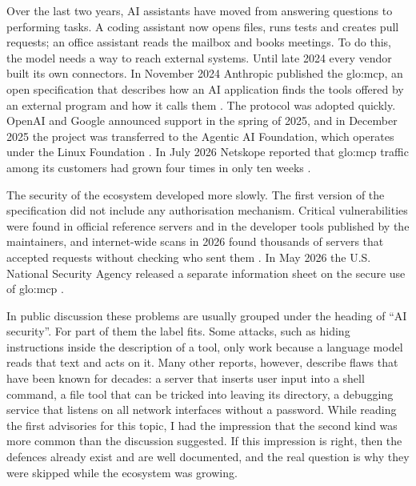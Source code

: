
\par Over the last two years, AI assistants have moved from answering questions to performing tasks. A coding assistant now opens files, runs tests and creates pull requests; an office assistant reads the mailbox and books meetings. To do this, the model needs a way to reach external systems. Until late 2024 every vendor built its own connectors. In November 2024 Anthropic published the \acrfull{glo:mcp}, an open specification that describes how an AI application finds the tools offered by an external program and how it calls them \cite{anthropic2024mcp}. The protocol was adopted quickly. OpenAI and Google announced support in the spring of 2025, and in December 2025 the project was transferred to the Agentic AI Foundation, which operates under the Linux Foundation \cite{aaif2025}. In July 2026 Netskope reported that \acrshort{glo:mcp} traffic among its customers had grown four times in only ten weeks \cite{netskope2026}.

\par The security of the ecosystem developed more slowly. The first version of the specification did not include any authorisation mechanism. Critical vulnerabilities were found in official reference servers and in the developer tools published by the maintainers, and internet-wide scans in 2026 found thousands of servers that accepted requests without checking who sent them \cite{zhou2026, padilla2026}. In May 2026 the U.S. National Security Agency released a separate information sheet on the secure use of \acrshort{glo:mcp} \cite{nsa2026}.

\par In public discussion these problems are usually grouped under the heading of ``AI security''. For part of them the label fits. Some attacks, such as hiding instructions inside the description of a tool, only work because a language model reads that text and acts on it. Many other reports, however, describe flaws that have been known for decades: a server that inserts user input into a shell command, a file tool that can be tricked into leaving its directory, a debugging service that listens on all network interfaces without a password. While reading the first advisories for this topic, I had the impression that the second kind was more common than the discussion suggested. If this impression is right, then the defences already exist and are well documented, and the real question is why they were skipped while the ecosystem was growing.

